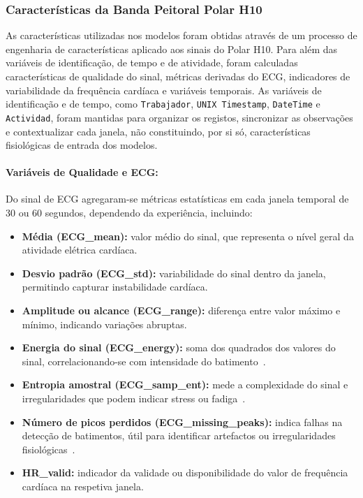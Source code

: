 \subsubsection*{Características da Banda Peitoral Polar H10}

As características utilizadas nos modelos foram obtidas através de um processo de engenharia de características aplicado aos sinais do Polar H10. Para além das variáveis de identificação, de tempo e de atividade, foram calculadas características de qualidade do sinal, métricas derivadas do ECG, indicadores de variabilidade da frequência cardíaca e variáveis temporais. As variáveis de identificação e de tempo, como \texttt{Trabajador}, \texttt{UNIX Timestamp}, \texttt{DateTime} e \texttt{Actividad}, foram mantidas para organizar os registos, sincronizar as observações e contextualizar cada janela, não constituindo, por si só, características fisiológicas de entrada dos modelos.

\paragraph{Variáveis de Qualidade e ECG:}

Do sinal de ECG agregaram-se métricas estatísticas em cada janela temporal de 30 ou 60 segundos, dependendo da experiência, incluindo:

\begin{itemize}
\item \textbf{Média (ECG\_mean):} valor médio do sinal, que representa o nível geral da atividade elétrica cardíaca.
\item \textbf{Desvio padrão (ECG\_std):} variabilidade do sinal dentro da janela, permitindo capturar instabilidade cardíaca.
\item \textbf{Amplitude ou alcance (ECG\_range):} diferença entre valor máximo e mínimo, indicando variações abruptas.
\item \textbf{Energia do sinal (ECG\_energy):} soma dos quadrados dos valores do sinal, correlacionando-se com intensidade do batimento~\cite{pantompkins1985}.
\item \textbf{Entropia amostral (ECG\_samp\_ent):} mede a complexidade do sinal e irregularidades que podem indicar stress ou fadiga~\cite{richman2000}.
\item \textbf{Número de picos perdidos (ECG\_missing\_peaks):} indica falhas na detecção de batimentos, útil para identificar artefactos ou irregularidades fisiológicas~\cite{adarri2017}.
\item \textbf{HR\_valid:} indicador da validade ou disponibilidade do valor de frequência cardíaca na respetiva janela.
\end{itemize}

